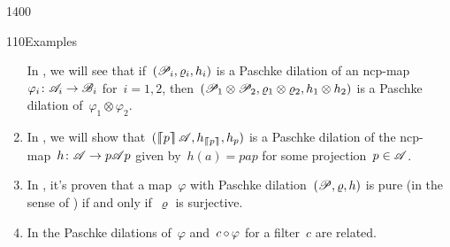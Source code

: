 \begin{parsec}{1400}
\begin{point}{110}{Examples}
\begin{enumerate}
In , we will see
    that if~$(\scrP_i, \varrho_i, h_i)$
    is a Paschke dilation of an ncp-map~$\varphi_i \colon \scrA_i \to \scrB_i$
    for~$i=1,2$,
    then~$(\scrP_1 \otimes \scrP_2, \varrho_1\otimes \varrho_2, h_1\otimes h_2)$
    is a Paschke dilation of~$\varphi_1 \otimes \varphi_2$.
\item
In , we will
    show that~$(\cceil{p}\scrA, h_{\cceil{p}}, h_p)$
    is a Paschke dilation of the
    ncp-map~$h\colon \mathscr{A} \to p \mathscr{A} p$
    given by~$h(a) = pap$ for some projection~$p\in \mathscr{A}$.
\item
In , it's proven
    that a map~$\varphi$
    with Paschke dilation~$(\mathscr{P}, \varrho, h)$
    is pure (in the sense of )
    if and only if~$\varrho$ is surjective.
\item
In 
    the Paschke dilations of~$\varphi$
    and~$c \mathop{\circ} \varphi$ for a filter~$c$ are related.
\end{enumerate}
\spacingfix{}
\end{point}
\end{parsec}

